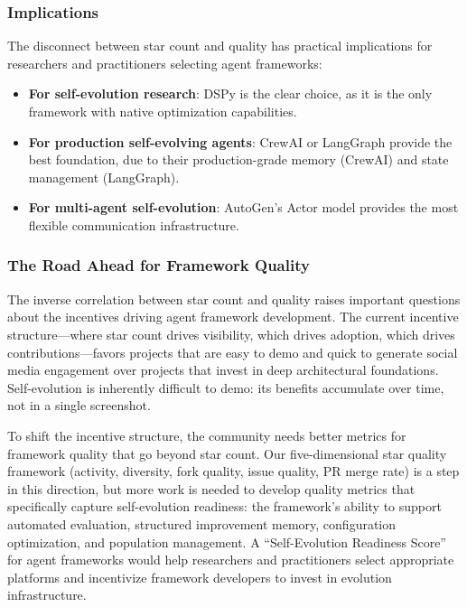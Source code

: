 \subsubsection{Implications}

The disconnect between star count and quality has practical implications for researchers and practitioners selecting agent frameworks:

\begin{itemize}
    \item \textbf{For self-evolution research}: DSPy is the clear choice, as it is the only framework with native optimization capabilities.
    \item \textbf{For production self-evolving agents}: CrewAI or LangGraph provide the best foundation, due to their production-grade memory (CrewAI) and state management (LangGraph).
    \item \textbf{For multi-agent self-evolution}: AutoGen's Actor model provides the most flexible communication infrastructure.
\end{itemize}

\subsubsection{The Road Ahead for Framework Quality}

The inverse correlation between star count and quality raises important questions about the incentives driving agent framework development. The current incentive structure---where star count drives visibility, which drives adoption, which drives contributions---favors projects that are easy to demo and quick to generate social media engagement over projects that invest in deep architectural foundations. Self-evolution is inherently difficult to demo: its benefits accumulate over time, not in a single screenshot.

To shift the incentive structure, the community needs better metrics for framework quality that go beyond star count. Our five-dimensional star quality framework (activity, diversity, fork quality, issue quality, PR merge rate) is a step in this direction, but more work is needed to develop quality metrics that specifically capture self-evolution readiness: the framework's ability to support automated evaluation, structured improvement memory, configuration optimization, and population management. A ``Self-Evolution Readiness Score'' for agent frameworks would help researchers and practitioners select appropriate platforms and incentivize framework developers to invest in evolution infrastructure.


